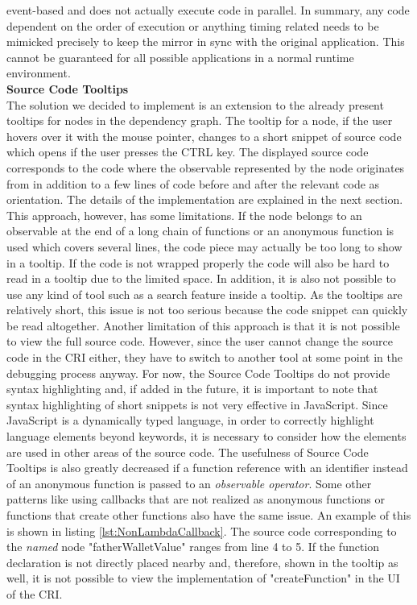 event-based \cite{EventBasedJS} and does not actually execute code in parallel. In summary, any code dependent on the order of execution or anything timing related needs to be mimicked precisely to keep the mirror in sync with the original application. This cannot be guaranteed for all possible applications in a normal runtime environment. \\
 
\textbf{Source Code Tooltips}\\
The solution we decided to implement is an extension to the already present tooltips for nodes in the dependency graph. The tooltip for a node, if the user hovers over it with the mouse pointer, changes to a short snippet of source code which opens if the user presses the CTRL key. The displayed source code corresponds to the code where the observable represented by the node originates from in addition to a few lines of code before and after the relevant code as orientation. The details of the implementation are explained in the next section. This approach, however, has some limitations. If the node belongs to an observable at the end of a long chain of functions or an anonymous function is used which covers several lines, the code piece may actually be too long to show in a tooltip. If the code is not wrapped properly the code will also be hard to read in a tooltip due to the limited space. In addition, it is also not possible to use any kind of tool such as a search feature inside a tooltip. As the tooltips are relatively short, this issue is not too serious because the code snippet can quickly be read altogether. Another limitation of this approach is that it is not possible to view the full source code. However, since the user cannot change the source code in the CRI either, they have to switch to another tool at some point in the debugging process anyway. For now, the Source Code Tooltips do not provide syntax highlighting and, if added in the future, it is important to note that syntax highlighting of short snippets is not very effective in JavaScript. Since JavaScript is a dynamically typed language, in order to correctly highlight language elements beyond keywords, it is necessary to consider how the elements are used in other areas of the source code. The usefulness of Source Code Tooltips is also greatly decreased if a function reference with an identifier instead of an anonymous function is passed to an \emph{observable operator}. Some other patterns like using callbacks that are not realized as anonymous functions or functions that create other functions also have the same issue. An example of this is shown in listing \ref{lst:NonLambdaCallback}. The source code corresponding to the \emph{named} node "fatherWalletValue" ranges from line 4 to 5. If the function declaration is not directly placed nearby and, therefore, shown in the tooltip as well, it is not possible to view the implementation of "createFunction" in the UI of the CRI.

